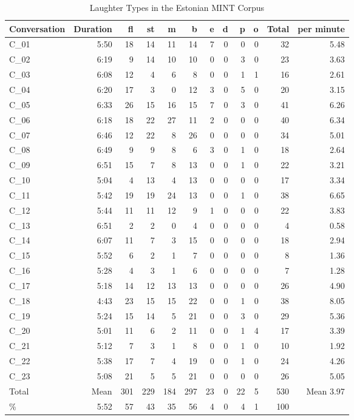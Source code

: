 \documentclass[10pt,journal,compsoc]{IEEEtran}
\begin{document}
\begin{table}[!t]
\caption{Laughter Types in the Estonian MINT Corpus}
\label{tab:laughter-estonian}
\centering
\begin{tabular}{| l | r | r r | r r r r r r | r | r |}
\hline
Conversation & Duration & fl  & st & m & b & e & d & p & o & Total & per minute \\
\hline
C\_01 & 5:50 & 18 & 14 & 11 & 14 & 7 & 0 & 0 & 0 & 32 & 5.48 \\
C\_02 & 6:19 & 9 & 14 & 10 & 10 & 0 & 0 & 3 & 0 & 23 & 3.63 \\
C\_03 & 6:08 & 12 & 4 & 6 & 8 & 0 & 0 & 1 & 1 & 16 & 2.61 \\
C\_04 & 6:20 & 17 & 3 & 0 & 12 & 3 & 0 & 5 & 0 & 20 & 3.15 \\
C\_05 & 6:33 & 26 & 15 & 16 & 15 & 7 & 0 & 3 & 0 & 41 & 6.26 \\
C\_06 & 6:18 & 18 & 22 & 27 & 11 & 2 & 0 & 0 & 0 & 40 & 6.34 \\
C\_07 & 6:46 & 12 & 22 & 8 & 26 & 0 & 0 & 0 & 0 & 34 & 5.01 \\
C\_08 & 6:49 & 9 & 9 & 8 & 6 & 3 & 0 & 1 & 0 & 18 & 2.64 \\
C\_09 & 6:51 & 15 & 7 & 8 & 13 & 0 & 0 & 1 & 0 & 22 & 3.21 \\
C\_10 & 5:04 & 4 & 13 & 4 & 13 & 0 & 0 & 0 & 0 & 17 & 3.34 \\
C\_11 & 5:42 & 19 & 19 & 24 & 13 & 0 & 0 & 1 & 0 & 38 & 6.65 \\
C\_12 & 5:44 & 11 & 11 & 12 & 9 & 1 & 0 & 0 & 0 & 22 & 3.83 \\
C\_13 & 6:51 & 2 & 2 & 0 & 4 & 0 & 0 & 0 & 0 & 4 & 0.58 \\
C\_14 & 6:07 & 11 & 7 & 3 & 15 & 0 & 0 & 0 & 0 & 18 & 2.94 \\
C\_15 & 5:52 & 6 & 2 & 1 & 7 & 0 & 0 & 0 & 0 & 8 & 1.36 \\
C\_16 & 5:28 & 4 & 3 & 1 & 6 & 0 & 0 & 0 & 0 & 7 & 1.28 \\
C\_17 & 5:18 & 14 & 12 & 13 & 13 & 0 & 0 & 0 & 0 & 26 & 4.90 \\
C\_18 & 4:43 & 23 & 15 & 15 & 22 & 0 & 0 & 1 & 0 & 38 & 8.05 \\
C\_19 & 5:24 & 15 & 14 & 5 & 21 & 0 & 0 & 3 & 0 & 29 & 5.36 \\
C\_20 & 5:01 & 11 & 6 & 2 & 11 & 0 & 0 & 1 & 4 & 17 & 3.39 \\
C\_21 & 5:12 & 7 & 3 & 1 & 8 & 0 & 0 & 1 & 0 & 10 & 1.92 \\
C\_22 & 5:38 & 17 & 7 & 4 & 19 & 0 & 0 & 1 & 0 & 24 & 4.26 \\
C\_23 & 5:08 & 21 & 5 & 5 & 21 & 0 & 0 & 0 & 0 & 26 & 5.05 \\
\hline
Total & Mean  & 301 & 229 & 184 & 297 & 23 & 0 & 22 & 5 & 530 & Mean 3.97 \\
 \%   & 5:52 &  57 &  43 &  35 &  56 &  4 &  0 & 4 & 1 & 100 &  \\
\hline
\end{tabular}
\end{table}
\end{document}
